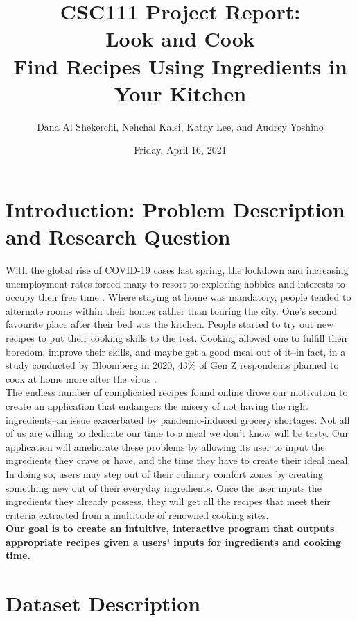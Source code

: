 \documentclass[fontsize=11pt]{article}
\title{ CSC111 Project Report: \\
\Large Look and Cook \\
Find Recipes Using Ingredients in Your Kitchen}
\author{Dana Al Shekerchi, Nehchal Kalsi, Kathy Lee, and Audrey Yoshino}
\date{Friday, April 16, 2021}
\begin{document}
    \maketitle

    \section*{Introduction: Problem Description and Research Question}
    With the global rise of COVID-19 cases last spring, the lockdown and increasing unemployment rates forced many to resort to exploring hobbies and interests to occupy their free time \cite{hobbies}. Where staying at home was mandatory, people tended to alternate rooms within their homes rather than touring the city. One's second favourite place after their bed was the kitchen. People started to try out new recipes to put their cooking skills to the test. Cooking allowed one to fulfill their boredom, improve their skills, and maybe get a good meal out of it–in fact, in a study conducted by Bloomberg in 2020, 43\% of Gen Z respondents planned to cook at home more after the virus \cite{cooking}. \\

    The endless number of complicated recipes found online drove our motivation to create an application that endangers the misery of not having the right ingredients–an issue exacerbated by pandemic-induced grocery shortages. Not all of us are willing to dedicate our time to a meal we don't know will be tasty. Our application will ameliorate these problems by allowing its user to input the ingredients they crave or have, and the time they have to create their ideal meal. In doing so, users may step out of their culinary comfort zones by creating something new out of their everyday ingredients. Once the user inputs the ingredients they already possess, they will get all the recipes that meet their criteria extracted from a multitude of renowned cooking sites. \\

    \textbf{Our goal is to create an intuitive, interactive program that outputs appropriate recipes given a users' inputs for ingredients and cooking time.}


    \section*{Dataset Description}
    \label{dataset}
\end{document}
